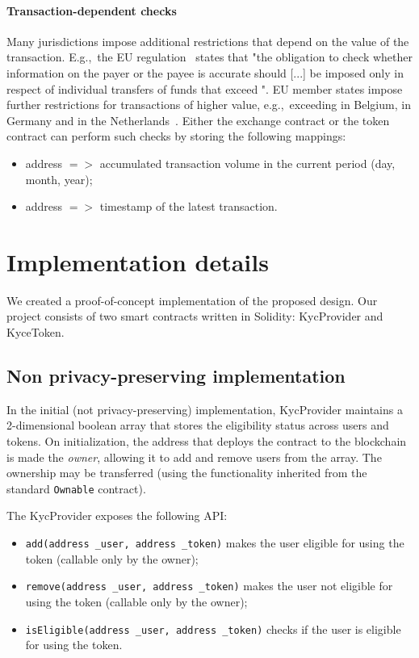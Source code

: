 \paragraph{Transaction-dependent checks}

Many jurisdictions impose additional restrictions that depend on the value of the transaction.
E.g.,~the EU regulation~\cite{EU847} states that "the obligation to check whether information on the payer or the payee is accurate should [...] be imposed only in respect of individual transfers of funds that exceed ".
EU member states impose further restrictions for transactions of higher value, e.g.,~exceeding  in Belgium,  in Germany and in the Netherlands~\cite{PWC2015}.
Either the exchange contract or the token contract can perform such checks by storing the following mappings:
\begin{itemize}
	\item address $=>$ accumulated transaction volume in the current period (day, month, year);
	\item address $=>$ timestamp of the latest transaction. 
\end{itemize}




\section{Implementation details}

We created a proof-of-concept implementation of the proposed design.
Our project consists of two smart contracts written in Solidity: KycProvider and KyceToken.

\subsection{Non privacy-preserving implementation}
In the initial (not privacy-preserving) implementation, KycProvider maintains a 2-dimensional boolean array that stores the eligibility status across users and tokens.
On initialization, the address that deploys the contract to the blockchain is made the \textit{owner}, allowing it to add and remove users from the array.
The ownership may be transferred (using the functionality inherited from the standard \texttt{Ownable} contract).

The KycProvider exposes the following API:

\begin{itemize}
	\item \texttt{add(address \_user, address \_token)} makes the user eligible for using the token (callable only by the owner);
	\item \texttt{remove(address \_user, address \_token)} makes the user not eligible for using the token (callable only by the owner);
	\item \texttt{isEligible(address \_user, address \_token)} checks if the user is eligible for using the token.
\end{itemize}

